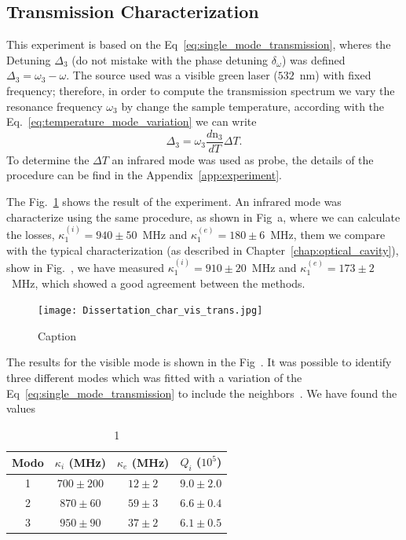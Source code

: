 \subsection{Transmission Characterization}

This experiment is based on the Eq~\ref{eq:single_mode_transmission}, wheres the Detuning $\Delta_3$ (do not mistake with the phase detuning $\delta_\omega$) was defined $\Delta_3 = \omega_3 - \omega$. The source used was a visible green laser ($532$~nm) with fixed frequency; therefore, in order to compute the transmission spectrum we vary the resonance frequency $\omega_3$ by change the sample temperature, according with the Eq.~\ref{eq:temperature_mode_variation} we can write 
\begin{equation}
    \Delta_3 = \omega_3\frac{d\text{n}_3}{dT}\Delta T.
\end{equation}
To determine the $\Delta T$ an infrared mode was used as probe, the details of the procedure can be find in the Appendix~\ref{app:experiment}.

The Fig.~\ref{fig:mode_char_trans} shows the result of the experiment. An infrared mode was characterize using the same procedure, as shown in Fig~a, where we can calculate the losses, $\kappa_1^{(i)} = 940\pm 50$~MHz and $\kappa_1^{(e)} = 180 \pm 6$~MHz, them we compare with the typical characterization (as described in Chapter~\ref{chap:optical_cavity}), show in Fig.~, we have measured $\kappa_1^{(i)} = 910\pm 20$~MHz and $\kappa_1^{(e)} = 173 \pm 2$~MHz, which showed a good agreement between the methods.
\begin{figure}[!h]
    \centering
    \texttt{[image: Dissertation\_char\_vis\_trans.jpg]}
    \caption{Caption}
    \label{fig:mode_char_trans}
\end{figure}

The results for the visible mode is shown in the Fig~. It was possible to identify three different modes which was fitted with a variation of the Eq~\ref{eq:single_mode_transmission} to include the neighbors~\needcit. We have found the values
\begin{table}[h]
\centering
\begin{tabularx}{8cm}{c|c|c|c}
Modo & $\kappa_i$ (MHz) & $\kappa_e$ (MHz) & $Q_i$ ($10^5$) \\ 
\hline                               
1 &$700\pm200$&$12\pm2$&$9.0\pm2.0$\\
2 &$870\pm60$&$59\pm3$&$6.6\pm0.4$\\
3 &$950\pm90$&$37\pm2$&$6.1\pm0.5$
\end{tabularx}
\caption{1}
\end{table}

